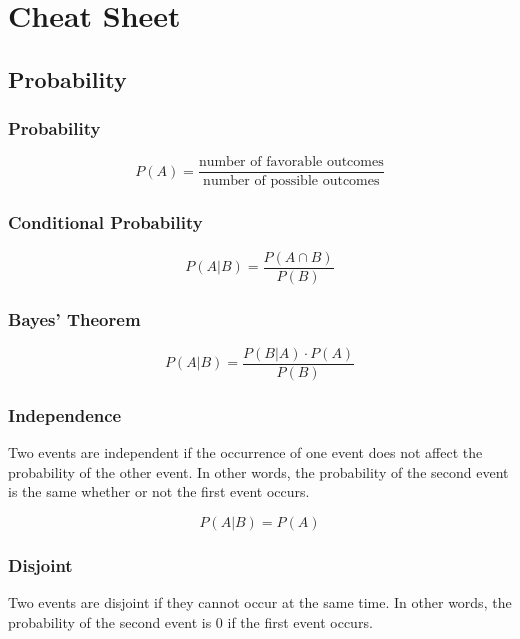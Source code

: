 \documentclass[11pt]{article}
\begin{document}
\def\invisibleHI{ \invisible{Hi} }
\def\invisible#1{ {\color{white}{#1}}  }

\def\forcenewline{ {\color{white} .} \newline }
\def\forcenewpage{ {\color{white} .} \newpage }



\section{Cheat Sheet}
\label{sec:orgb9124ce}
\subsection{Probability}
\label{sec:org4aecc9d}
\subsubsection{Probability}
\label{sec:orgdd110b0}
\[
P(A) = \frac{\text{number of favorable outcomes}}{\text{number of possible outcomes}}
\]

\subsubsection{Conditional Probability}
\label{sec:org333200d}
\[
P(A|B) = \frac{P(A \cap B)}{P(B)}
\]

\subsubsection{Bayes' Theorem}
\label{sec:orgd5903ca}
\[
P(A|B) = \frac{P(B|A) \cdot P(A)}{P(B)}
\]

\subsubsection{Independence}
\label{sec:orgca6bfdd}
Two events are independent if the occurrence of one event does not affect the probability of the other event. In other words, the probability of the second event is the same whether or not the first event occurs.

\[
P(A|B) = P(A)
\]

\subsubsection{Disjoint}
\label{sec:orgfa7d4b0}
Two events are disjoint if they cannot occur at the same time. In other words, the probability of the second event is 0 if the first event occurs.
\end{document}
